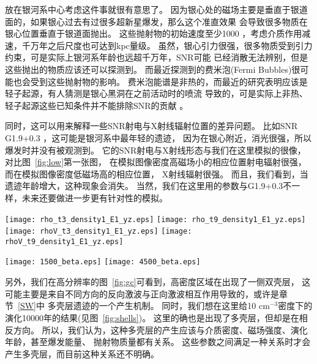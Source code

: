 放在银河系中心考虑这件事就很有意思了。
因为银心处的磁场主要是垂直于银道面的，如果银心过去有过很多超新星爆发，那么这个准直效果
会导致很多物质在银心位置垂直于银道面抛出。
这些抛射物的初始速度至少1000 \kms ，考虑介质作用减速，千万年之后尺度也可达到kpc量级。
虽然，银心引力很强，很多物质受到引力约束，可是实际上银河系年龄也远超千万年，SNR可能
已经消散无法辨别，但是这些抛出的物质应该还可以探测到。
而最近探测到的费米泡(Fermi Bubbles)很可能也会受到这些抛射物的影响。
费米泡能谱是非热的，而最近的研究表明应该是轻子起源，有人猜测是银心黑洞在之前活动时的喷流
导致的\citep{Yang2017}，可是实际上非热、轻子起源这些已知条件并不能排除SNR的贡献
\citep{Fujita2013}。

同时，这可以用来解释一些SNR射电与X射线辐射位置的差异问题。
比如SNR G1.9+0.3 \citep{Reynolds2008,Borkowski2017}，这可能是银河系中最年轻的遗迹，
因为在银心附近，消光很强，所以爆发时并没有被观测到。
它的SNR射电与X射线形态与我们在这里模拟的很像，对比图~\ref{fig:low}第一张图，
在模拟图像密度高磁场小的相应位置射电辐射很强，而在模拟图像密度低磁场高的相应位置，
X射线辐射很强。
而且，我们看到，当遗迹年龄增大，这种现象会消失。
当然，我们在这里用的参数与G1.9+0.3不一样，未来还要做进一步更有针对性的模拟。

\begin{figure*}
    \centering
    \texttt{[image: rho\_t3\_density1\_E1\_yz.eps]}
    \texttt{[image: rho\_t9\_density1\_E1\_yz.eps]}\newline
    \texttt{[image: rhoV\_t3\_density1\_E1\_yz.eps]}
    \texttt{[image: rhoV\_t9\_density1\_E1\_yz.eps]}
    \caption{强磁场下的低分辨率模拟的介质密度为0.5 cm$^{-3}$的模拟结果。
    上面两幅图是1500年和4500年后的密度、磁场分布，
    下面两幅图是1500年和4500年后的密度、速度分布。}
\label{fig:low}
\end{figure*}

\begin{figure*}
    \centering
    \texttt{[image: 1500\_beta.eps]}
    \texttt{[image: 4500\_beta.eps]}
    \caption{介质密度为0.5 cm$^{-3}$的$\beta_b$分布。
    左图是1500年后的$\beta_b$分布，右图是4500年后的$log(\beta_b)$分布。}
\label{fig:beta}
\end{figure*}

另外，我们在高分辨率的图~\ref{fig:gc}可看到，高密度区域在出现了一侧双壳层，
这可能主要是来自不同方向的反向激波与正向激波相互作用导致的，或许是章节~\ref{SW}中
多壳层遗迹的一个产生机制。
同时，我们想在这里给10 cm$^{-3}$密度下的演化10000年的结果(见图~\ref{fig:shells})。
这里的确也是出现了多壳层，但却是在相反方向。
所以，我们认为，这种多壳层的产生应该与介质密度、磁场强度、演化年龄，甚至爆发能量、
抛射物质量都有关系。
这些参数之间满足一种关系时才会产生多壳层，而目前这种关系还不明确。

